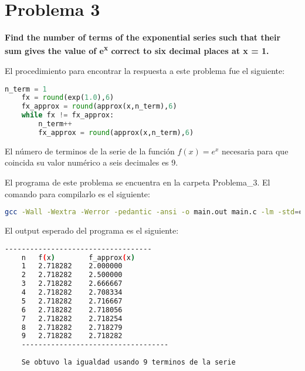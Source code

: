 \section*{Problema 3}
\textbf{Find the number of terms of the exponential series such that their sum gives the value of e\textsuperscript{x} correct to six decimal places at x = 1.}

El procedimiento para encontrar la respuesta a este problema fue el siguiente:
\begin{lstlisting}[language=python]
    n_term = 1
    fx = round(exp(1.0),6)
    fx_approx = round(approx(x,n_term),6)
    while fx != fx_approx:
        n_term++
        fx_approx = round(approx(x,n_term),6)
\end{lstlisting}

El número de terminos de la serie de la función $f(x)=e^x$ necesaria para que coincida su valor numérico a seis decimales es 9.

El programa de este problema se encuentra en la carpeta \textcolor{citecolor}{Problema\_3}. El comando para compilarlo es el siguiente:

\begin{lstlisting}[language=bash]
    gcc -Wall -Wextra -Werror -pedantic -ansi -o main.out main.c -lm -std=c11
\end{lstlisting}

El output esperado del programa es el siguiente:
\begin{lstlisting}[language=bash]
    -----------------------------------
    n	f(x)		f_approx(x)
    1	2.718282	2.000000
    2	2.718282	2.500000
    3	2.718282	2.666667
    4	2.718282	2.708334
    5	2.718282	2.716667
    6	2.718282	2.718056
    7	2.718282	2.718254
    8	2.718282	2.718279
    9	2.718282	2.718282
    -----------------------------------
    
    Se obtuvo la igualdad usando 9 terminos de la serie
\end{lstlisting}